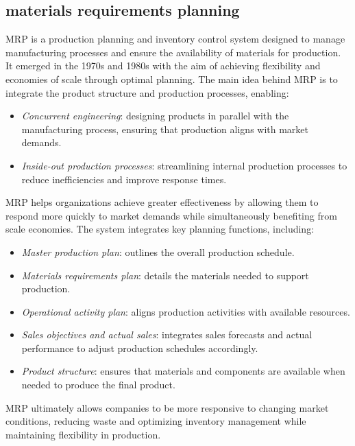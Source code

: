 \subsection{materials requirements planning}
MRP is a production planning and inventory control system designed to manage manufacturing processes and ensure the availability of materials for production.
It emerged in the 1970s and 1980s with the aim of achieving flexibility and economies of scale through optimal planning. 
The main idea behind MRP is to integrate the product structure and production processes, enabling:
\begin{itemize}
    \item \textit{Concurrent engineering}: designing products in parallel with the manufacturing process, ensuring that production aligns with market demands.
    \item \textit{Inside-out production processes}: streamlining internal production processes to reduce inefficiencies and improve response times.
\end{itemize}
\noindent MRP helps organizations achieve greater effectiveness by allowing them to respond more quickly to market demands while simultaneously benefiting from scale economies. 
The system integrates key planning functions, including:
\begin{itemize}
    \item \textit{Master production plan}: outlines the overall production schedule.
    \item \textit{Materials requirements plan}: details the materials needed to support production.
    \item \textit{Operational activity plan}: aligns production activities with available resources.
    \item \textit{Sales objectives and actual sales}: integrates sales forecasts and actual performance to adjust production schedules accordingly.
    \item \textit{ Product structure}: ensures that materials and components are available when needed to produce the final product.
\end{itemize}
\noindent MRP ultimately allows companies to be more responsive to changing market conditions, reducing waste and optimizing inventory management while maintaining flexibility in production.